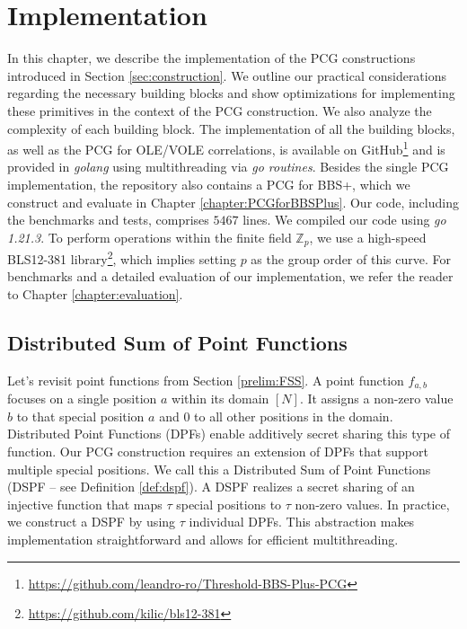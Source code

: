 \chapter{Implementation}
\label{chapter:ImplementingPCGs}
In this chapter, we describe the implementation of the PCG constructions introduced in Section \ref{sec:construction}. We outline our practical considerations regarding the necessary building blocks and show optimizations for implementing these primitives in the context of the PCG construction. We also analyze the complexity of each building block. The implementation of all the building blocks, as well as the PCG for OLE/VOLE correlations, is available on GitHub\footnote{\url{https://github.com/leandro-ro/Threshold-BBS-Plus-PCG}} and is provided in \textit{golang} using multithreading via \textit{go routines}. Besides the single PCG implementation, the repository also contains a PCG for BBS+, which we construct and evaluate in Chapter \ref{chapter:PCGforBBSPlus}. Our code, including the benchmarks and tests, comprises $5467$
lines. We compiled our code using \textit{go 1.21.3}. To perform operations within the finite field $\mathbb{Z}_p$, we use a high-speed BLS12-381 library\footnote{\url{https://github.com/kilic/bls12-381}}, which implies setting $p$ as the group order of this curve. For benchmarks and a detailed evaluation of our implementation, we refer the reader to Chapter \ref{chapter:evaluation}.

\section{Distributed Sum of Point Functions}
\label{sec:dspfImplementation}
Let's revisit point functions from Section \ref{prelim:FSS}.  A point function $f_{a,b}$ focuses on a single position $a$ within its domain $[N]$. It assigns a non-zero value $b$ to that special position $a$ and $0$ to all other positions in the domain. Distributed Point Functions (DPFs) enable additively secret sharing this type of function. Our PCG construction requires an extension of DPFs that support multiple special positions. We call this a Distributed Sum of Point Functions (DSPF – see Definition \ref{def:dspf}). A DSPF realizes a secret sharing of an injective function that maps $\tau$ special positions to $\tau$ non-zero values. In practice, we construct a DSPF by using $\tau$ individual DPFs. This abstraction makes implementation straightforward and allows for efficient multithreading.

